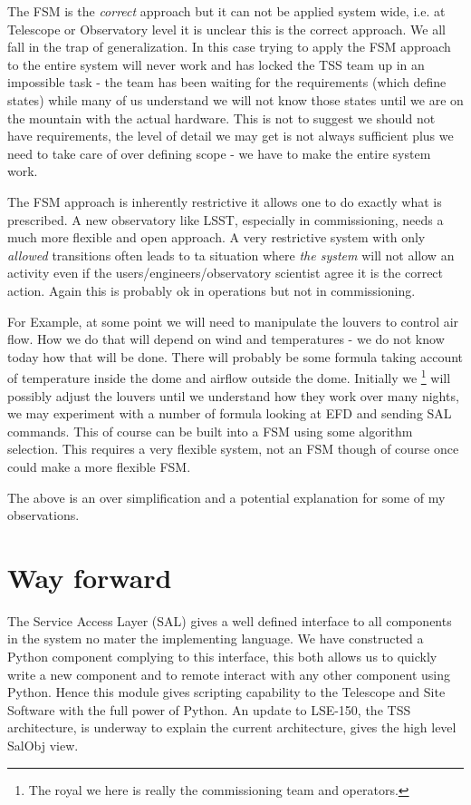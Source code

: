 The FSM is the {\em correct} approach  but it can not be applied system wide, i.e. at Telescope or Observatory level it is unclear this is the correct approach. We all fall in the trap of generalization.
In this case trying to apply the FSM approach to the entire system will never work and has locked the TSS team up in an impossible task -
the team has been waiting for the requirements (which define states)  while many of us understand we will not know those states until we are on the mountain with the actual hardware. This is not to suggest we should not have requirements, the level of detail we may get is not always sufficient plus we need to take care of over defining scope - we have to make the entire system work.

The FSM approach is inherently restrictive  it allows one to do exactly what is prescribed. A new observatory like LSST, especially in commissioning, needs a much more flexible and open approach. A very restrictive system with only {\em allowed} transitions often leads to ta situation where {\em the system} will not allow an activity even if the users/engineers/observatory scientist agree it is the correct action. Again this is probably ok in operations but not in commissioning.

For Example, at some point we will need to manipulate the louvers to control air flow.
 How we do that will depend on wind and temperatures - we do not know today how that will be done.
There will probably be some formula taking account of temperature inside the dome and airflow outside the dome.
Initially  we \footnote{The royal we here is really the commissioning team and operators.} will possibly adjust the louvers until we understand how they work over many nights, we may experiment with a number of formula looking at EFD and sending SAL commands. This of course can be built into a FSM using some algorithm selection.
 This requires a very flexible system,  not an FSM though of course once could make a more flexible FSM.

The above is an over simplification and a potential explanation for some of my observations.

\section{Way forward}
The Service Access Layer (SAL) gives a well defined interface to all components in the system no mater the implementing language.
We have constructed a Python component complying to this interface, this both allows us to quickly write a new component and to remote interact with any other component using Python. Hence this module gives scripting capability to the Telescope and Site Software with the full power of Python. An update to LSE-150, the TSS architecture, is underway to explain the current architecture,  gives the high level SalObj view.


